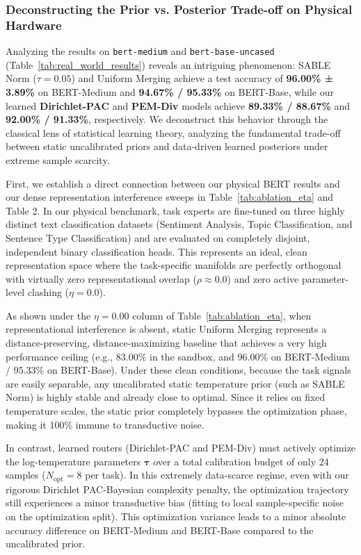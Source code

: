 \subsubsection{Deconstructing the Prior vs. Posterior Trade-off on Physical Hardware}
Analyzing the results on \texttt{bert-medium} and \texttt{bert-base-uncased} (Table~\ref{tab:real_world_results}) reveals an intriguing phenomenon: SABLE Norm ($\tau = 0.05$) and Uniform Merging achieve a test accuracy of \textbf{96.00\% ± 3.89\%} on BERT-Medium and \textbf{94.67\% / 95.33\%} on BERT-Base, while our learned \textbf{Dirichlet-PAC} and \textbf{PEM-Div} models achieve \textbf{89.33\% / 88.67\%} and \textbf{92.00\% / 91.33\%}, respectively.
We deconstruct this behavior through the classical lens of statistical learning theory, analyzing the fundamental trade-off between static uncalibrated priors and data-driven learned posteriors under extreme sample scarcity.

First, we establish a direct connection between our physical BERT results and our dense representation interference sweeps in Table~\ref{tab:ablation_eta} and Table 2. In our physical benchmark, task experts are fine-tuned on three highly distinct text classification datasets (Sentiment Analysis, Topic Classification, and Sentence Type Classification) and are evaluated on completely disjoint, independent binary classification heads. This represents an ideal, clean representation space where the task-specific manifolds are perfectly orthogonal with virtually zero representational overlap ($\rho \approx 0.0$) and zero active parameter-level clashing ($\eta = 0.0$). 

As shown under the $\eta = 0.00$ column of Table~\ref{tab:ablation_eta}, when representational interference is absent, static Uniform Merging represents a distance-preserving, distance-maximizing baseline that achieves a very high performance ceiling (e.g., $83.00\%$ in the sandbox, and $96.00\%$ on BERT-Medium / $95.33\%$ on BERT-Base). Under these clean conditions, because the task signals are easily separable, any uncalibrated static temperature prior (such as SABLE Norm) is highly stable and already close to optimal. Since it relies on fixed temperature scales, the static prior completely bypasses the optimization phase, making it 100\% immune to transductive noise.

In contrast, learned routers (Dirichlet-PAC and PEM-Div) must actively optimize the log-temperature parameters $\boldsymbol{\tau}$ over a total calibration budget of only 24 samples ($N_{\text{opt}} = 8$ per task). In this extremely data-scarce regime, even with our rigorous Dirichlet PAC-Bayesian complexity penalty, the optimization trajectory still experiences a minor transductive bias (fitting to local sample-specific noise on the optimization split). This optimization variance leads to a minor absolute accuracy difference on BERT-Medium and BERT-Base compared to the uncalibrated prior.

